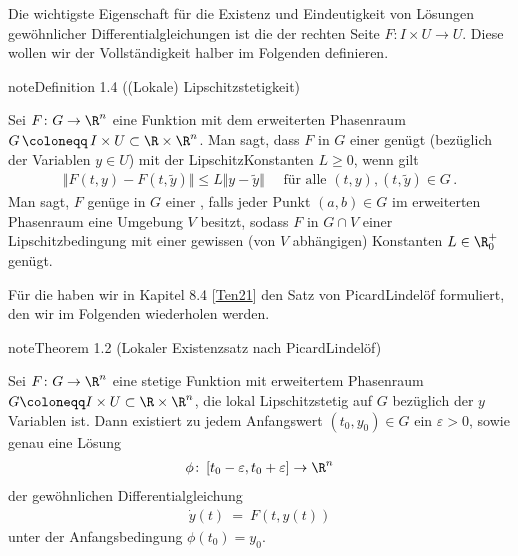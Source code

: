 \documentclass[letterpaper,10pt,english]{jupyterBook}
\begin{document}
\sphinxAtStartPar
Die wichtigste Eigenschaft für die Existenz und Eindeutigkeit von Lösungen gewöhnlicher Differentialgleichungen ist die  der rechten Seite \(F \colon I \times U \rightarrow U\).
Diese wollen wir der Vollständigkeit halber im Folgenden definieren.
\label{ode/repetition:definition-8}
\begin{sphinxadmonition}{note}{Definition 1.4 ((Lokale) Lipschitzstetigkeit)}



\sphinxAtStartPar
Sei \(F \colon G \to \R^n\) eine Funktion mit dem erweiterten Phasenraum \(G \, \coloneqq \, I \times U \subset \R\times\R^n\).
Man sagt, dass \(F\) in \(G\) einer  genügt (bezüglich der Variablen \(y \in U\)) mit der Lipschitz\sphinxhyphen{}Konstanten \(L\geq0\), wenn gilt
\begin{equation*}
\begin{split}\Vert F(t,y) - F(t,\widetilde{y}) \Vert \leq L \Vert y-\widetilde{y}\Vert\quad\text{ für alle }(t,y), (t,\widetilde{y})\in G\,.\end{split}
\end{equation*}
\sphinxAtStartPar
Man sagt, \(F\) genüge in \(G\) einer , falls jeder Punkt \((a,b)\in G\) im erweiterten Phasenraum eine Umgebung \(V\) besitzt, sodass \(F\) in \(G\cap V\) einer Lipschitzbedingung mit einer gewissen (von \(V\) abhängigen) Konstanten \(L\in\R_0^+\) genügt.
\end{sphinxadmonition}

\sphinxAtStartPar
Für die  haben wir in Kapitel 8.4 {[}\hyperlink{cite.references:id10}{Ten21}{]} den Satz von Picard\sphinxhyphen{}Lindelöf formuliert, den wir im Folgenden wiederholen werden.
\label{ode/repetition:satz:picardlindeloef_lokal}
\begin{sphinxadmonition}{note}{Theorem 1.2 (Lokaler Existenzsatz nach Picard\sphinxhyphen{}Lindelöf)}



\sphinxAtStartPar
Sei \(F\colon G\to\R^n\) eine stetige Funktion mit erweitertem Phasenraum \(G \coloneqq I \times U \subset \R\times\R^n\), die lokal Lipschitz\sphinxhyphen{}stetig auf \(G\) bezüglich der \(y\)\sphinxhyphen{}Variablen ist.
Dann existiert zu jedem Anfangswert \((t_0,y_0) \in G\) ein \(\varepsilon>0\), sowie genau eine Lösung
\begin{equation*}
\begin{split}\phi \colon \left[t_0-\varepsilon, t_0+\varepsilon\right] \to \R^n\end{split}
\end{equation*}
\sphinxAtStartPar
der gewöhnlichen Differentialgleichung
\begin{equation*}
\begin{split}\dot{y}(t) \ = \ F(t,y(t))\end{split}
\end{equation*}
\sphinxAtStartPar
unter der Anfangsbedingung \(\phi(t_0)=y_0\).
\end{sphinxadmonition}
\end{document}
